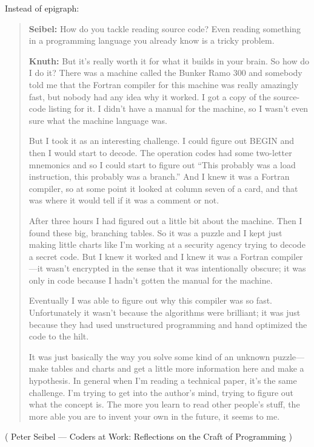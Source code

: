 Instead of epigraph:

\begin{framed}
\begin{quotation}

\textbf{Seibel:} How do you tackle reading source code? Even reading something in
a programming language you already know is a tricky problem.

\textbf{Knuth:} But it’s really worth it for what it builds in your brain. So how do I
do it? There was a machine called the Bunker Ramo 300 and somebody told
me that the Fortran compiler for this machine was really amazingly fast, but
nobody had any idea why it worked. I got a copy of the source-code listing
for it. I didn’t have a manual for the machine, so I wasn’t even sure what the
machine language was.

But I took it as an interesting challenge. I could figure out BEGIN and then I
would start to decode. The operation codes had some two-letter
mnemonics and so I could start to figure out “This probably was a load
instruction, this probably was a branch.” And I knew it was a Fortran
compiler, so at some point it looked at column seven of a card, and that was
where it would tell if it was a comment or not.

After three hours I had figured out a little bit about the machine. Then I
found these big, branching tables. So it was a puzzle and I kept just making
little charts like I’m working at a security agency trying to decode a secret
code. But I knew it worked and I knew it was a Fortran compiler—it wasn’t
encrypted in the sense that it was intentionally obscure; it was only in code
because I hadn’t gotten the manual for the machine.

Eventually I was able to figure out why this compiler was so fast.
Unfortunately it wasn’t because the algorithms were brilliant; it was just
because they had used unstructured programming and hand optimized the
code to the hilt.

It was just basically the way you solve some kind of an unknown puzzle—
make tables and charts and get a little more information here and make a
hypothesis. In general when I’m reading a technical paper, it’s the same
challenge. I’m trying to get into the author’s mind, trying to figure out what
the concept is. The more you learn to read other people’s stuff, the more
able you are to invent your own in the future, it seems to me.

\end{quotation}
\end{framed}

( Peter Seibel --- Coders at Work: Reflections on the Craft of Programming )

